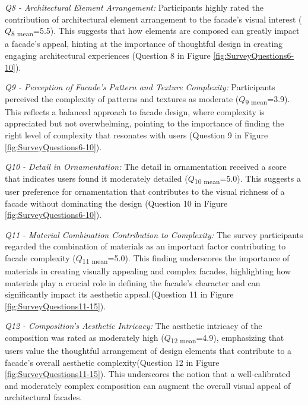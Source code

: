 \textit{Q8 - Architectural Element Arrangement:}
Participants highly rated the contribution of architectural element arrangement to the facade's visual interest  (\(Q\)\textsubscript{\small{8 mean}}=5.5).
This suggests that how elements are composed can greatly impact a facade's appeal, hinting at the importance of thoughtful design in creating engaging architectural experiences (Question 8 in Figure \ref{fig:SurveyQuestions6-10}).

\textit{Q9 - Perception of Facade's Pattern and Texture Complexity:}
Participants perceived the complexity of patterns and textures as moderate  (\(Q\)\textsubscript{\small{9 mean}}=3.9).
This reflects a balanced approach to facade design, where complexity is appreciated but not overwhelming, pointing to the importance of finding the right level of complexity that resonates with users (Question 9 in Figure \ref{fig:SurveyQuestions6-10}).

\textit{Q10 - Detail in Ornamentation:}
The detail in ornamentation received a score that indicates users found it moderately detailed  (\(Q\)\textsubscript{\small{10 mean}}=5.0).
This suggests a user preference for ornamentation that contributes to the visual richness of a facade without dominating the design (Question 10 in Figure \ref{fig:SurveyQuestions6-10}).

\textit{Q11 - Material Combination Contribution to Complexity:}
The survey participants regarded the combination of materials as an important factor contributing to facade complexity (\(Q\)\textsubscript{\small{11 mean}}=5.0).
This finding underscores the importance of materials in creating visually appealing and complex facades, highlighting how materials play a crucial role in defining the facade's character and can significantly impact its aesthetic appeal.(Question 11 in Figure \ref{fig:SurveyQuestions11-15}).

\textit{Q12 - Composition's Aesthetic Intricacy:}
The aesthetic intricacy of the composition was rated as moderately high (\(Q\)\textsubscript{\small{12 mean}}=4.9), emphasizing that users value the thoughtful arrangement of design elements that contribute to a facade's overall aesthetic complexity(Question 12 in Figure \ref{fig:SurveyQuestions11-15}). This underscores the notion that a well-calibrated and moderately complex composition can augment the overall visual appeal of architectural facades.

